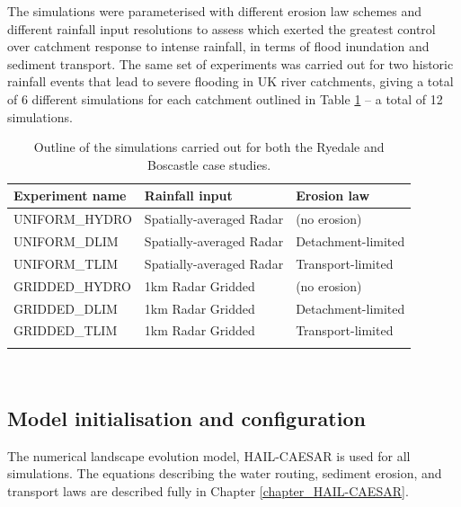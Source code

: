 The simulations were parameterised with different erosion law schemes and different rainfall input resolutions to assess which exerted the greatest control over catchment response to intense rainfall, in terms of flood inundation and sediment transport. The same set of experiments was carried out for two historic rainfall events that lead to severe flooding in UK river catchments, giving a total of 6 different simulations for each catchment outlined in Table \ref{table_ensemble_experiments} -- a total of 12 simulations.

\begin{table}
\begin{tabular}{lll}
\\
\textbf{Experiment name}   & \textbf{Rainfall input} & \textbf{Erosion law}  \\
\hline
UNIFORM\_HYDRO  &  Spatially-averaged  Radar  & (no erosion) \\
UNIFORM\_DLIM      &  Spatially-averaged  Radar & Detachment-limited \\
UNIFORM\_TLIM       &  Spatially-averaged  Radar & Transport-limited \\

GRIDDED\_HYDRO  &  1km Radar Gridded  & (no erosion) \\
GRIDDED\_DLIM      &  1km Radar Gridded  & Detachment-limited \\
GRIDDED\_TLIM       &  1km Radar Gridded   & Transport-limited \\
\hline \\ 
\end{tabular} 
\caption{Outline of the simulations carried out for both the Ryedale and Boscastle case studies.}
\label{table_ensemble_experiments}
\end{table}

\

\subsection{Model initialisation and configuration}
The numerical landscape evolution model, HAIL-CAESAR is used for all simulations.  The equations describing the water routing, sediment erosion, and transport laws are described fully in Chapter \ref{chapter_HAIL-CAESAR}.
%

